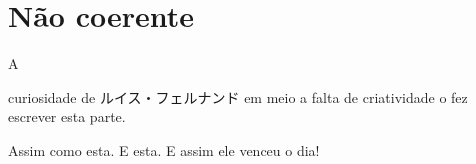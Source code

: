 


\section{Não coerente}\label{??}

\lipsum[1]
A
\begin{japo}
curiosidade de ルイス・フェルナンド  em meio a falta de criatividade o fez escrever esta parte.
\end{japo} Assim como esta.
E esta. E assim ele venceu o dia!
